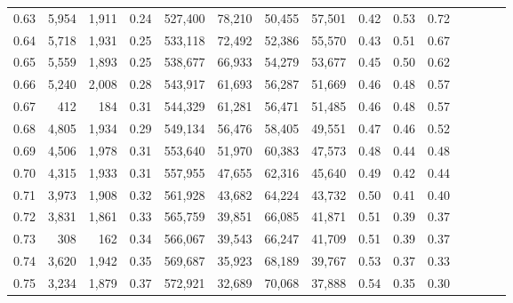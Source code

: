 \begin{tabular}{rrrcrrrrrrrrrrr}
0.63 &   5,954 &  1,911 &                                       0.24 &  527,400 &   78,210 &   50,455 &   57,501 &  0.42 &  0.53 &                         0.72 \\
0.64 &   5,718 &  1,931 &                                       0.25 &  533,118 &   72,492 &   52,386 &   55,570 &  0.43 &  0.51 &                         0.67 \\
0.65 &   5,559 &  1,893 &                                       0.25 &  538,677 &   66,933 &   54,279 &   53,677 &  0.45 &  0.50 &                         0.62 \\
0.66 &   5,240 &  2,008 &                                       0.28 &  543,917 &   61,693 &   56,287 &   51,669 &  0.46 &  0.48 &                         0.57 \\
0.67 &     412 &    184 &                                       0.31 &  544,329 &   61,281 &   56,471 &   51,485 &  0.46 &  0.48 &                         0.57 \\
0.68 &   4,805 &  1,934 &                                       0.29 &  549,134 &   56,476 &   58,405 &   49,551 &  0.47 &  0.46 &                         0.52 \\
0.69 &   4,506 &  1,978 &                                       0.31 &  553,640 &   51,970 &   60,383 &   47,573 &  0.48 &  0.44 &                         0.48 \\
0.70 &   4,315 &  1,933 &                                       0.31 &  557,955 &   47,655 &   62,316 &   45,640 &  0.49 &  0.42 &                         0.44 \\
0.71 &   3,973 &  1,908 &                                       0.32 &  561,928 &   43,682 &   64,224 &   43,732 &  0.50 &  0.41 &                         0.40 \\
0.72 &   3,831 &  1,861 &                                       0.33 &  565,759 &   39,851 &   66,085 &   41,871 &  0.51 &  0.39 &                         0.37 \\
0.73 &     308 &    162 &                                       0.34 &  566,067 &   39,543 &   66,247 &   41,709 &  0.51 &  0.39 &                         0.37 \\
0.74 &   3,620 &  1,942 &                                       0.35 &  569,687 &   35,923 &   68,189 &   39,767 &  0.53 &  0.37 &                         0.33 \\
0.75 &   3,234 &  1,879 &                                       0.37 &  572,921 &   32,689 &   70,068 &   37,888 &  0.54 &  0.35 &                         0.30 \\

\end{tabular}
